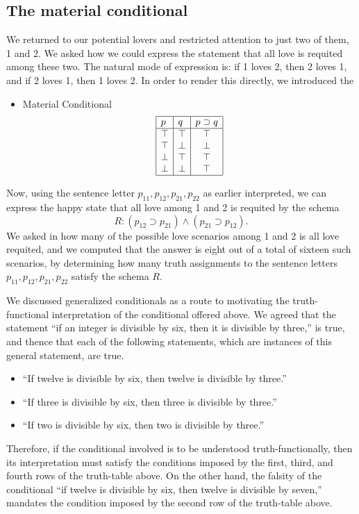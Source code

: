 \subsection{The material conditional}

We returned to our potential lovers and restricted attention to just two of them, 1 and 2. We asked how we could express the statement that all love is requited among these two. The natural mode of expression is: if 1 loves 2, then 2 loves 1, and if 2 loves 1, then 1 loves 2. In order to render this directly, we introduced the
\begin{itemize}
\item Material Conditional
\[
\begin{array}{|l|l|c|} \hline
p   & q  &  p \supset q   \\ \hline
\top & \top & \top  \\
\top & \bot & \bot  \\
\bot & \top & \top  \\   
\bot & \bot & \top \\
\hline
\end{array}
\]
\end{itemize}
Now, using the sentence letter $p_{11}, p_{12}, p_{21}, p_{22}$ as earlier interpreted, we can express the happy state that all love among 1 and 2 is requited by the schema
\[ R: (p_{12}\supset p_{21}) \wedge (p_{21}\supset p_{12}).\]
We asked in how many of the possible love scenarios among 1 and 2 is all love requited, and we computed that the answer is eight out of a total of sixteen such scenarios, by determining how many truth assignments to the sentence letters  $p_{11}, p_{12}, p_{21}, p_{22}$ satisfy the schema $R$.

We discussed generalized conditionals as a route to motivating the truth-functional interpretation of the conditional offered above. We agreed that the statement ``if an integer is divisible by six, then it is divisible by three,'' is true, and thence that each of the following statements, which are instances of this general statement, are true.
\begin{itemize}
\item ``If twelve is divisible by six, then twelve is divisible by three.''
\item ``If three is divisible by six, then three is divisible by three.''
\item ``If two is divisible by six, then two is divisible by three.''
\end{itemize}
Therefore, if the conditional involved is to be understood truth-functionally, then its interpretation must satisfy the conditions imposed by the first, third, and fourth rows of the truth-table above. On the other hand, the falsity of the conditional ``if twelve is divisible by six, then twelve is divisible by seven,'' mandates the condition imposed by the second row of the truth-table above.

